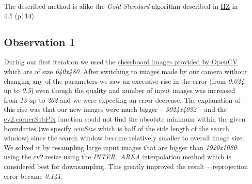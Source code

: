 \documentclass[paper=a4, fontsize=11pt]{scrartcl}
\numberwithin{equation}{section}		%
\numberwithin{figure}{section}			%
\numberwithin{table}{section}				%
\begin{document}
The described method is alike the \emph{Gold Standard} algorithm described in \href{http://www.robots.ox.ac.uk/~vgg/hzbook/}{HZ} in 4.5 (p114).

\subsection*{Observation 1}
During our first iteration we used the \href{https://github.com/opencv/opencv/blob/master/samples/data/left01.jpg}{chessboard images provided by OpenCV} which are of size \emph{640x480}. After switching to images made by our camera without changing any of the parameters we saw an excessive rise in the error (from \emph{0.024} up to \emph{0.5}) even though the quality and number of input images was increased from \emph{13} up to \emph{262} and we were expecting an error decrease. The explanation of this rise was that our new images were much bigger -- \emph{3024x4032} -- and the \href{https://docs.opencv.org/2.4/modules/imgproc/doc/feature_detection.html#cv2.cornerSubPix}{cv2.cornerSubPix} function could not find the absolute minimum within the given boundaries (we specify \emph{winSize} which is half of the side length of the search window) since the search window became relatively smaller to overall image size. We solved it by resampling large input images that are bigger than \emph{1920x1080} using the \href{https://docs.opencv.org/2.4/modules/imgproc/doc/geometric_transformations.html#resize}{cv2.resize} using the \emph{INTER\_AREA} interpolation method which is considered best for downsampling. This greatly improved  the result -- reprojection error became \emph{0.141}.
\end{document}
